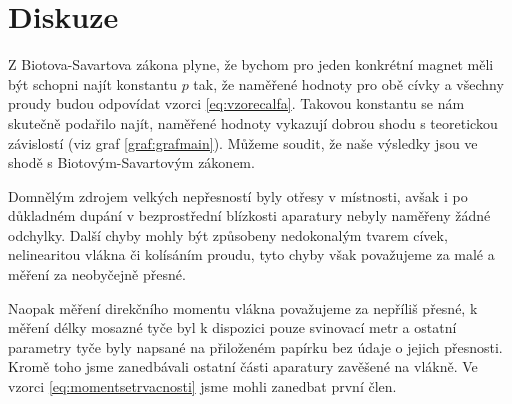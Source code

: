 \section*{Diskuze}
Z Biotova-Savartova zákona plyne, že bychom pro jeden konkrétní magnet měli být schopni najít konstantu $p$ tak, že naměřené hodnoty pro obě cívky a všechny proudy budou odpovídat vzorci \eqref{eq:vzorecalfa}.
Takovou konstantu se nám skutečně podařilo najít, naměřené hodnoty vykazují dobrou shodu s teoretickou závislostí (viz graf \ref{graf:grafmain}).
Můžeme soudit, že naše výsledky jsou ve shodě s Biotovým-Savartovým zákonem.

Domnělým zdrojem velkých nepřesností byly otřesy v místnosti, avšak i po důkladném dupání v bezprostřední blízkosti aparatury nebyly naměřeny žádné odchylky.
Další chyby mohly být způsobeny nedokonalým tvarem cívek, nelinearitou vlákna či kolísáním proudu, tyto chyby však považujeme za malé a měření za neobyčejně přesné.

Naopak měření direkčního momentu vlákna považujeme za nepříliš přesné, k měření délky mosazné tyče byl k dispozici pouze svinovací metr a ostatní parametry tyče byly napsané na přiloženém papírku bez údaje o jejich přesnosti.
Kromě toho jsme zanedbávali ostatní části aparatury zavěšené na vlákně.
Ve vzorci \eqref{eq:momentsetrvacnosti} jsme mohli zanedbat první člen.

